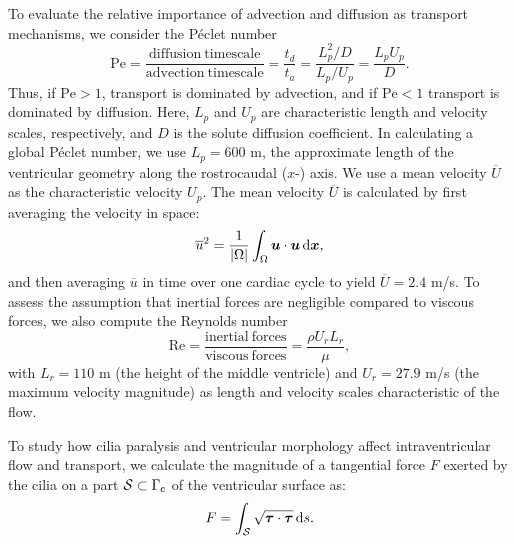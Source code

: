 \documentclass{WileyMSP-template}
\begin{document}
To evaluate the relative importance of advection and
diffusion as transport mechanisms, we consider the Péclet number
\begin{equation*}
    \mathrm{Pe} = \frac{\mathrm{diffusion \ timescale}}{\mathrm{advection \ timescale}}
    = \frac{t_d}{t_a} = \frac{L_p^2/D}{L_p/U_p} = \frac{L_p U_p}{D}.
\end{equation*}
Thus, if $\mathrm{Pe} > 1$, transport is dominated by advection,
and if $\mathrm{Pe} < 1$ transport is dominated by diffusion.
Here, $L_p$ and $U_p$ are characteristic length and velocity scales,
respectively, and $D$ is the solute diffusion coefficient.
In calculating a global Péclet number, we use $L_p=600$ \textmu m, the approximate length of the
ventricular geometry along the rostrocaudal ($x$-) axis.
We use a mean velocity $\overline{U}$ as the characteristic velocity $U_p$.
The mean velocity $\overline{U}$ is calculated by first averaging the velocity in space:
\begin{equation*}
    \overline{u}^2 = \frac{1}{|\Omega|}\int_{\Omega}\bm{u}\cdot\bm{u}\, \mathrm d\bm{x},
\end{equation*}
and then averaging $\overline{u}$ in time over one cardiac cycle to yield $\overline{U} = 2.4$ \textmu m/s.
To assess the assumption that inertial forces are negligible compared to
viscous forces, we also compute the Reynolds number
\begin{equation*}
    \mathrm{Re} = \frac{\mathrm{inertial \ forces}}{\mathrm{viscous \ forces}} = \frac{\rho U_r L_r}{\mu},
\end{equation*}
with $L_r = 110$ \textmu m (the height of the middle ventricle) and
$U_r = 27.9$ \textmu m/s (the maximum velocity magnitude)
as length and velocity scales characteristic of the flow.

To study how cilia paralysis and ventricular morphology affect intraventricular
flow and transport, we calculate the magnitude of a tangential force $F$ 
exerted by the cilia on a part $\mathcal{S}\subset\Gamma_{\mathrm{c}}$ of the ventricular surface as:
\begin{equation}
    F = \int_{\mathcal{S}}\sqrt{\bm{\tau}\cdot\bm{\tau}}\,\mathrm ds.
    \label{eq:tangential_force_calculation}
\end{equation}
\end{document}
